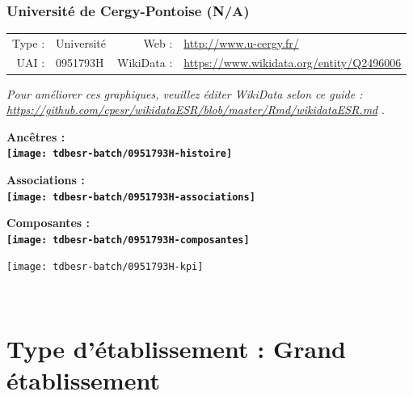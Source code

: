 \documentclass[12pt,french,]{article}
\begin{document}
\ifoddpage \fi ~\newpage  

\hypertarget{universituxe9-de-cergy-pontoise-na}{%
\subsubsection{Université de Cergy-Pontoise
(N/A)}\label{universituxe9-de-cergy-pontoise-na}}

\begin{tabular*}{\textwidth}{rp{5cm}rl}  
\hline  
Type : & Université & Web : &\href{http://www.u-cergy.fr/}{http://www.u-cergy.fr/} \\  
UAI : & 0951793H & WikiData : & \href{https://www.wikidata.org/entity/Q2496006}{https://www.wikidata.org/entity/Q2496006} \\  
\hline  
\end{tabular*}

\textit{\scriptsize Pour améliorer ces graphiques, veuillez éditer WikiData selon ce guide :  \href{https://github.com/cpesr/wikidataESR/blob/master/Rmd/wikidataESR.md}{https://github.com/cpesr/wikidataESR/blob/master/Rmd/wikidataESR.md}}
.

\vspace{1cm}  
\begin{minipage}[b]{0.50\textwidth}\begin{center} \bf Ancêtres : \\  
\texttt{[image: tdbesr-batch/0951793H-histoire]} \end{center}\end{minipage}\begin{minipage}[b]{0.50\textwidth}\begin{center} \bf Associations : \\  
\texttt{[image: tdbesr-batch/0951793H-associations]} \end{center}\end{minipage}

\hrulefill

\begin{center} \bf Composantes : \\  
\texttt{[image: tdbesr-batch/0951793H-composantes]} \end{center}

\begin{center}\texttt{[image: tdbesr-batch/0951793H-kpi]} \end{center}\checkoddpage

\ifoddpage \fi ~\newpage  

\hypertarget{type-duxe9tablissement-grand-uxe9tablissement}{%
\section{Type d'établissement : Grand
établissement}\label{type-duxe9tablissement-grand-uxe9tablissement}}
\end{document}
